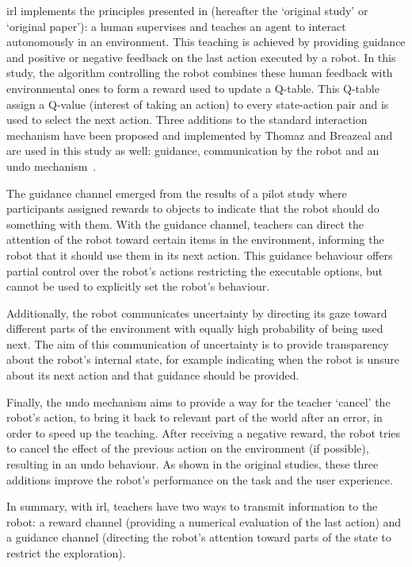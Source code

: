 \gls{irl} implements the principles presented in \cite{thomaz2008teachable} (hereafter the `original study' or `original paper'): a human supervises and teaches an agent to interact autonomously in an environment. This teaching is achieved by providing guidance and positive or negative feedback on the last action executed by a robot. In this study, the algorithm controlling the robot combines these human feedback with environmental ones to form a reward used to update a Q-table. This Q-table assign a Q-value (interest of taking an action) to every state-action pair and is used to select the next action. Three additions to the standard interaction mechanism have been proposed and implemented by Thomaz and Breazeal and are used in this study as well: guidance, communication by the robot and an undo mechanism~\citep{thomaz2008teachable}. 

The guidance channel emerged from the results of a pilot study where participants assigned rewards to objects to indicate that the robot should do something with them. With the guidance channel, teachers can direct the attention of the robot toward certain items in the environment, informing the robot that it should use them in its next action. This guidance behaviour offers partial control over the robot's actions restricting the executable options, but cannot be used to explicitly set the robot's behaviour. 

Additionally, the robot communicates uncertainty by directing its gaze toward different parts of the environment with equally high probability of being used next. The aim of this communication of uncertainty is to provide transparency about the robot's internal state, for example indicating when the robot is unsure about its next action and that guidance should be provided. 

Finally, the undo mechanism aims to provide a way for the teacher `cancel' the robot's action, to bring it back to relevant part of the world after an error, in order to speed up the teaching. After receiving a negative reward, the robot tries to cancel the effect of the previous action on the environment (if possible), resulting in an undo behaviour. As shown in the original studies, these three additions improve the robot's performance on the task and the user experience.

In summary, with \gls{irl}, teachers have two ways to transmit information to the robot: a reward channel (providing a numerical evaluation of the last action) and a guidance channel (directing the robot's attention toward parts of the state to restrict the exploration).

